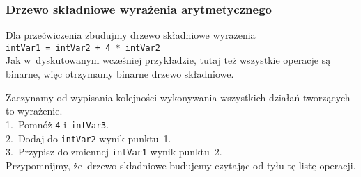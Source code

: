 \documentclass[10pt,t]{beamer}
\begin{document}
\label{sec:Podstawy-budowy-procesora-i-jezyka-asemblera}


\begin{frame}
  \frametitle{Drzewo składniowe wyrażenia arytmetycznego}


  Dla przećwiczenia zbudujmy drzewo składniowe wyrażenia \\
  \texttt{intVar1 = intVar2 + 4 * intVar2} \\
  Jak w~dyskutowanym wcześniej przykładzie, tutaj też wszystkie operacje są
  binarne, więc otrzymamy binarne drzewo składniowe.

  Zaczynamy od wypisania kolejności wykonywania wszystkich działań
  tworzących to wyrażenie. \\
  1.~Pomnóż \texttt{4} i~\texttt{intVar3}. \\
  2.~Dodaj do \texttt{intVar2} wynik punktu~1. \\
  3.~Przypisz do zmiennej \texttt{intVar1} wynik punktu~2. \\
  Przypomnijmy, że~drzewo składniowe budujemy czytając od tyłu tę listę
  operacji.

\end{frame}
\end{document}
